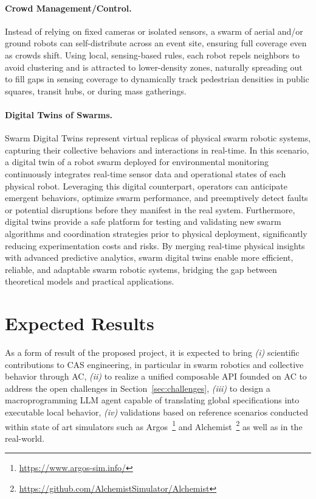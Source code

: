 \documentclass[12pt]{article}
\begin{document}
\paragraph{Crowd Management/Control.} 
Instead of relying on fixed cameras or isolated sensors, a swarm of aerial and/or ground robots can self-distribute across an event site, ensuring full coverage even as crowds shift.
Using local, sensing-based rules, each robot repels neighbors to avoid clustering and is attracted to lower-density zones, naturally spreading out to fill gaps in sensing coverage
to dynamically track pedestrian densities in public squares, transit hubs, or during mass gatherings.

\paragraph{Digital Twins of Swarms.}
Swarm Digital Twins represent virtual replicas of physical swarm robotic systems, capturing their collective behaviors and interactions in real-time. 
In this scenario, a digital twin of a robot swarm deployed for environmental monitoring continuously integrates real-time sensor data and operational states of each physical robot. 
Leveraging this digital counterpart, operators can anticipate emergent behaviors, optimize swarm performance, and preemptively detect faults or potential disruptions before they manifest in the real system. 
Furthermore, digital twins provide a safe platform for testing and validating new swarm algorithms and coordination strategies prior to physical deployment, significantly reducing experimentation costs and risks. 
By merging real-time physical insights with advanced predictive analytics, swarm digital twins enable more efficient, reliable, and adaptable swarm robotic systems, bridging the gap between theoretical models and practical applications.
\section{Expected Results}
As a form of result of the proposed project, it is expected to bring \textit{(i)} scientific contributions to CAS engineering, in particular in swarm robotics and collective behavior through AC,
\textit{(ii)} to realize a unified composable API founded on AC to address the open challenges in Section~\ref{sec:challenges}, 
\textit{(iii)} to design a macroprogramming LLM agent capable of translating global specifications into executable local behavior,
\textit{(iv)} validations based on reference scenarios conducted within state of art simulators such as Argos~\footnote{\url{https://www.argos-sim.info/}} and Alchemist~\footnote{\url{https://github.com/AlchemistSimulator/Alchemist}} as well
as in the real-world.
\end{document}
